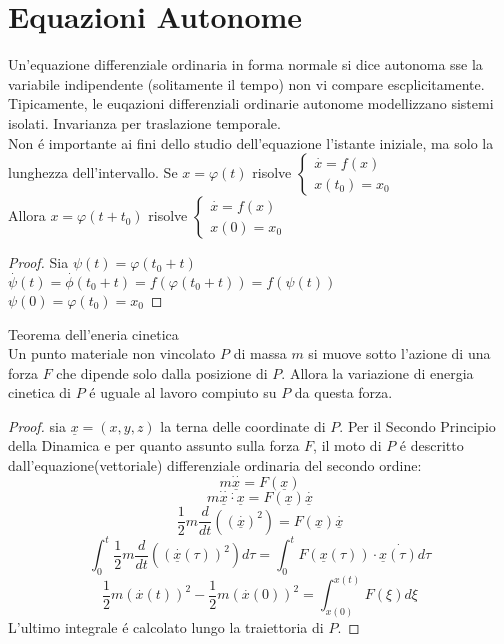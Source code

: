 \section{Equazioni Autonome}
Un'equazione differenziale ordinaria in forma normale si dice autonoma sse la variabile indipendente (solitamente il tempo) non vi compare escplicitamente.
\observation
Tipicamente, le euqazioni differenziali ordinarie autonome modellizzano sistemi isolati.
\observation Invarianza per traslazione temporale.\\
Non \'e importante ai fini dello studio dell'equazione l'istante iniziale, ma solo la lunghezza dell'intervallo.
Se  $x=\varphi(t)$ risolve $\left\{ \begin{matrix} \overset{\cdot}{x} = f(x)\\x(t_0)=x_0 \end{matrix} \right.$\\
Allora $x=\varphi(t+t_0)$ risolve $\left\{ \begin{matrix} \overset{\cdot}{x} = f(x)\\x(0)=x_0 \end{matrix} \right.$\\
\begin{proof}
	Sia $\psi(t)=\varphi(t_0+t)$\\
	$\overset{\cdot}{\psi}(t)=\overset{\cdot}{\phi}(t_0+t)=f(\varphi(t_0+t))=f(\psi(t))$\\
	$\psi(0)=\varphi(t_0)=x_0$ 
\end{proof}
\proposition Teorema dell'eneria cinetica\\
Un punto materiale non vincolato $P$ di massa $m$ si muove sotto l'azione di una forza $F$ che dipende solo dalla posizione di $P$. Allora la variazione di energia cinetica di $P$ \'e uguale al lavoro compiuto su $P$ da questa forza.
\begin{proof}
	sia $\underline{x}=(x,y,z)$ la terna delle coordinate di $P$. Per il Secondo Principio della Dinamica e per quanto assunto sulla forza $F$, il moto di $P$ \'e descritto dall'equazione(vettoriale) differenziale ordinaria del secondo ordine:\\
	$$m\overset{\cdot\cdot}{\underline{x}}=F(\underline{x})$$
	$$m\overset{\cdot\cdot}{\underline{x}}\overset{\cdot}\cdot{\underline{x}}=F(\underline{x})\overset{\cdot}{\underline{x}}$$
	$$\frac{1}{2}m\frac{d}{dt}\left(\left(\overset{\cdot}{\underline{x}}\right)^2\right)=F(\underline{x})\overset{\cdot}{\underline{x}}$$
	$$\int_{0}^t\frac{1}{2}m\frac{d}{dt}\left(\left(\overset{\cdot}{\underline{x}}(\tau)\right)^2\right)d\tau=\int_{0}^tF(\underline{x}(\tau))\cdot\overset{\cdot}{\underline{x}(\tau)}d\tau$$
	$$\frac{1}{2}m\left(\overset{\cdot}{x}(t)\right)^2-\frac{1}{2}m\left(\overset{\cdot}{x}(0)\right)^2 = \int_{x(0)}^{x(t)}F(\xi)d\xi$$
	L'ultimo integrale \'e calcolato lungo la traiettoria di $P$.
\end{proof}
